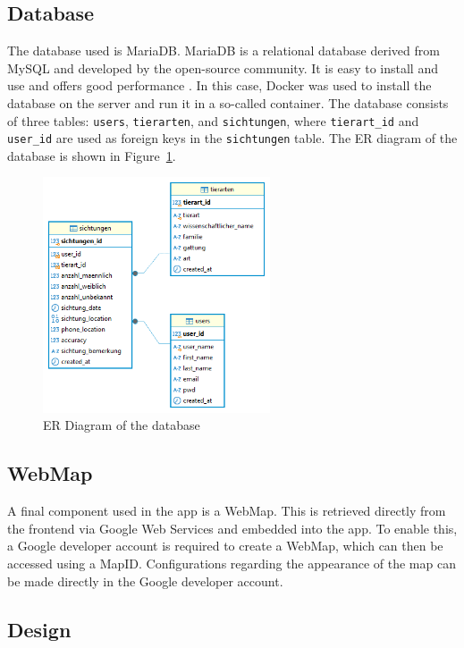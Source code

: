 \documentclass{josis}
\begin{document}
\subsection{Database}

The database used is MariaDB. MariaDB is a relational database derived from MySQL and developed by the open-source community. 
It is easy to install and use and offers good performance \cite{MariaDBFoundation}.
In this case, Docker was used to install the database on the server and run it in a so-called container. 
The database consists of three tables: \texttt{users}, \texttt{tierarten}, and \texttt{sichtungen}, 
where \texttt{tierart\_id} and \texttt{user\_id} are used as foreign keys in the \texttt{sichtungen} table. 
The ER diagram of the database is shown in Figure~\ref{fig:db_structure}.

\begin{figure}[tbh]
    \centering
    \includegraphics[width=0.6\textwidth]{images/db_structure.png}
    \caption{ER Diagram of the database}\label{fig:db_structure}
\end{figure}

\subsection{WebMap}

A final component used in the app is a WebMap. This is retrieved directly from the frontend 
via Google Web Services and embedded into the app. To enable this, 
a Google developer account is required to create a WebMap, 
which can then be accessed using a MapID. Configurations regarding the appearance of the map can be made directly in the Google developer account.

\subsection{Design}
\end{document}
